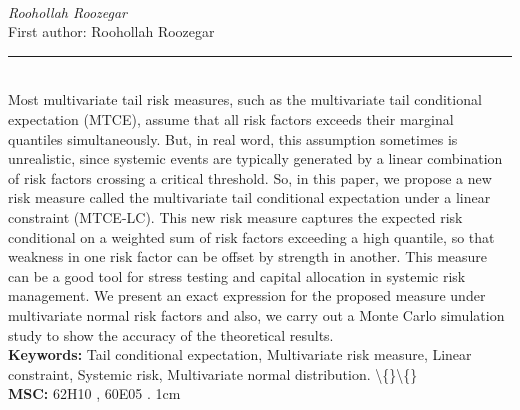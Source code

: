 \documentclass[10pt,twoside]{article}
\begin{document}
\noindent\begin{minipage}[t][\textheight]{\textwidth}
\\[0.35em]
{\itshape Roohollah Roozegar}\\[0.2em]
{\footnotesize First author: Roohollah Roozegar}\\[0.45em]
\noindent\rule{\textwidth}{0.3pt}\\[0.4em]
{\footnotesize  Most multivariate tail risk measures, such as the multivariate tail conditional expectation (MTCE), assume that all risk factors exceeds their marginal quantiles simultaneously. But, in real word, this assumption sometimes is unrealistic, since systemic events are typically generated by a linear combination of risk factors crossing a critical threshold. So, in this paper, we propose a new risk measure called the multivariate tail conditional expectation under a linear constraint (MTCE-LC). This new risk measure captures the expected risk conditional on a weighted sum of risk factors exceeding a high quantile, so that weakness in one risk factor can be offset by strength in another. This measure can be a good tool for stress testing and capital allocation in systemic risk management. We present an exact expression for the proposed measure under multivariate normal risk factors and also, we carry out a Monte Carlo simulation study to show the accuracy of the theoretical results.}\\[0.4em]
{\footnotesize\bfseries Keywords:} {\footnotesize Tail conditional expectation, Multivariate risk measure, Linear constraint, Systemic risk, Multivariate normal distribution. \textbackslash\{\}\textbackslash\{\}}\\[0.15em]
{\footnotesize\bfseries MSC:} {\footnotesize 62H10 , 60E05 . 1cm}\\
\vfill
\end{minipage}
\newpage
\end{document}
